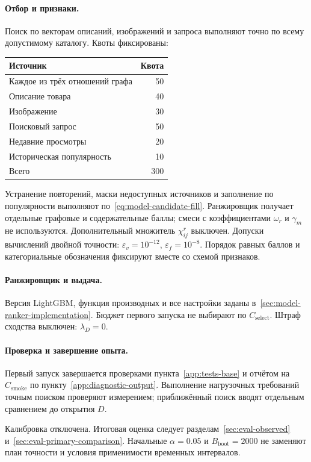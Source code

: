\documentclass[12pt,a4paper]{article}
\newcommand{\eps}{\varepsilon}
\theoremstyle{plainru}
\begin{document}
\paragraph{Отбор и признаки.}
Поиск по векторам описаний, изображений и запроса выполняют точно
по всему допустимому каталогу. Квоты фиксированы:
\begin{center}
\begin{tabular}{L{0.63\textwidth}r}
\toprule Источник & Квота \\\midrule
Каждое из трёх отношений графа & 50 \\
Описание товара & 40 \\
Изображение & 30 \\
Поисковый запрос & 50 \\
Недавние просмотры & 20 \\
Историческая популярность & 10 \\
\midrule Всего & 300 \\
\bottomrule
\end{tabular}
\end{center}
Устранение повторений, маски недоступных источников и заполнение
по популярности выполняют по~\eqref{eq:model-candidate-fill}.
Ранжировщик получает отдельные графовые и содержательные баллы;
смеси с коэффициентами $\omega_r$ и $\gamma_m$ не используются.
Дополнительный множитель $\chi_{ij}^r$ выключен.
Допуски вычислений двойной точности: $\eps_v=10^{-12}$,
$\eps_f=10^{-8}$. Порядок равных баллов и категориальные обозначения
фиксируют вместе со схемой признаков.

\paragraph{Ранжировщик и выдача.}
Версия LightGBM, функция производных и все настройки заданы
в~\ref{sec:model-ranker-implementation}. Бюджет первого запуска
не выбирают по $C_{\mathrm{select}}$. Штраф сходства выключен: $\lambda_D=0$.

\paragraph{Проверка и завершение опыта.}
Первый запуск завершается проверками пункта~\ref{app:tests-base}
и отчётом на $C_{\mathrm{smoke}}$ по пункту~\ref{app:diagnostic-output}.
Выполнение нагрузочных требований точным поиском проверяют измерением;
приближённый поиск вводят отдельным сравнением до открытия $D$.

Калибровка отключена. Итоговая оценка следует
разделам~\ref{sec:eval-observed} и~\ref{sec:eval-primary-comparison}.
Начальные $\alpha=0.05$ и
$B_{\mathrm{boot}}=2000$ не заменяют план точности и условия
применимости временных интервалов.
\end{document}

